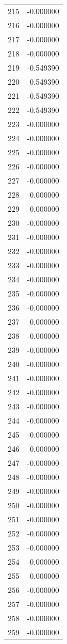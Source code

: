 \documentclass[12pt]{article}
\begin{document}
\begin{longtable}{@{}cc@{}}
215 & -0.000000 \\
216 & -0.000000 \\
217 & -0.000000 \\
218 & -0.000000 \\
219 & -0.549390 \\
220 & -0.549390 \\
221 & -0.549390 \\
222 & -0.549390 \\
223 & -0.000000 \\
224 & -0.000000 \\
225 & -0.000000 \\
226 & -0.000000 \\
227 & -0.000000 \\
228 & -0.000000 \\
229 & -0.000000 \\
230 & -0.000000 \\
231 & -0.000000 \\
232 & -0.000000 \\
233 & -0.000000 \\
234 & -0.000000 \\
235 & -0.000000 \\
236 & -0.000000 \\
237 & -0.000000 \\
238 & -0.000000 \\
239 & -0.000000 \\
240 & -0.000000 \\
241 & -0.000000 \\
242 & -0.000000 \\
243 & -0.000000 \\
244 & -0.000000 \\
245 & -0.000000 \\
246 & -0.000000 \\
247 & -0.000000 \\
248 & -0.000000 \\
249 & -0.000000 \\
250 & -0.000000 \\
251 & -0.000000 \\
252 & -0.000000 \\
253 & -0.000000 \\
254 & -0.000000 \\
255 & -0.000000 \\
256 & -0.000000 \\
257 & -0.000000 \\
258 & -0.000000 \\
259 & -0.000000 \\

\end{longtable}
\end{document}
